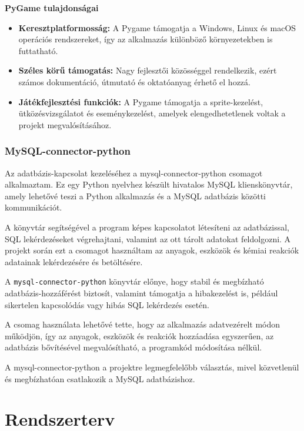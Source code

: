 \documentclass[]{thesis-ekf}
\begin{document}
	
	\textbf{PyGame tulajdonságai}
	\begin{itemize}
		\item \textbf{Keresztplatformosság:} A Pygame támogatja a Windows, Linux és macOS operációs rendszereket, így az alkalmazás különböző környezetekben is futtatható.
		
		\item \textbf{Széles körű támogatás:} Nagy fejlesztői közösséggel rendelkezik, ezért számos dokumentáció, útmutató és oktatóanyag érhető el hozzá.
		
		\item \textbf{Játékfejlesztési funkciók:} A Pygame támogatja a sprite-kezelést, ütközésvizsgálatot és eseménykezelést, amelyek elengedhetetlenek voltak a projekt megvalósításához.
	\end{itemize}
	
	\subsection{MySQL-connector-python}
	
	Az adatbázis-kapcsolat kezeléséhez a mysql-connector-python\cite{Oracle} csomagot alkalmaztam. Ez egy Python nyelvhez készült hivatalos MySQL klienskönyvtár, amely lehetővé teszi a Python alkalmazás és a MySQL adatbázis közötti kommunikációt.
	
	A könyvtár segítségével a program képes kapcsolatot létesíteni az adatbázissal, SQL lekérdezéseket végrehajtani, valamint az ott tárolt adatokat feldolgozni. A projekt során ezt a csomagot használtam az anyagok, eszközök és kémiai reakciók adatainak lekérdezésére és betöltésére.
	
	A \texttt{mysql-connector-python} könyvtár előnye, hogy stabil és megbízható adatbázis-hozzáférést biztosít, valamint támogatja a hibakezelést is, például sikertelen kapcsolódás vagy hibás SQL lekérdezés esetén.
	
	A csomag használata lehetővé tette, hogy az alkalmazás adatvezérelt módon működjön, így az anyagok, eszközök és reakciók hozzáadása egyszerűen, az adatbázis bővítésével megvalósítható, a programkód  módosítása nélkül.
	
	A mysql-connector-python a projektre legmegfelelőbb választás, mivel közvetlenül és megbízhatóan csatlakozik a MySQL adatbázishoz.
	
	\chapter{Rendszerterv} 
\end{document}
